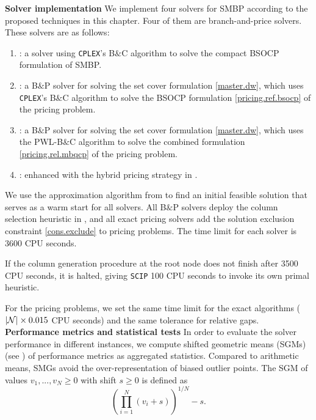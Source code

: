 \textbf{Solver implementation} We implement four solvers for SMBP according to the proposed techniques in this chapter. Four of them are branch-and-price solvers. These solvers are as follows:
\begin{enumerate}
   \item  \bsocpcomp: a  solver using \texttt{CPLEX}'s B$\&$C algorithm to solve the compact BSOCP formulation of SMBP.
   \item  \dwbc: a B$\&$P solver for solving the set cover formulation \eqref{master.dw}, which uses  \texttt{CPLEX}'s B$\&$C algorithm to solve the BSOCP formulation \eqref{pricing.ref.bsocp} of the pricing problem.
   \item \dwpwl:  a B$\&$P solver for solving the set cover formulation \eqref{master.dw}, which uses   the PWL-B$\&$C algorithm to solve the combined formulation \eqref{pricing.rel.mbqcp} of the pricing problem.
   \item \dwhybrid: \dwpwl enhanced with the hybrid pricing strategy in .
\end{enumerate}


 We use the approximation algorithm from \cite{cohen2019overcommitment} to find an initial feasible solution that serves as a warm start for all solvers. All B$\&$P solvers deploy the column selection heuristic in , and all exact pricing solvers add the solution exclusion constraint \eqref{cons.exclude} to pricing problems. The time limit for each solver is 3600 CPU seconds.

If the column generation procedure at the root node does not finish after 3500 CPU seconds, it is halted, giving \texttt{SCIP} 100 CPU seconds to invoke its own primal heuristic.

For the pricing problems, we set the same time limit for the exact algorithms ($|\mathcal N| \times 0.015$ CPU seconds) and the same tolerance for relative gaps. \\

\textbf{Performance metrics and statistical tests}  In order to evaluate the solver performance in
different instances, we compute  shifted geometric means (SGMs) (see \cite{achterberg2008constraint}) of performance metrics as aggregated statistics. Compared to arithmetic means, SMGs avoid the over-representation of biased outlier points. The SGM of values $v_1,...,v_N \geq 0$ with shift $s \geq 0$ is defined
as
\begin{equation*}
  \left(\prod_{i=1}^N (v_i + s)\right)^{1/N} - s.
\end{equation*}

